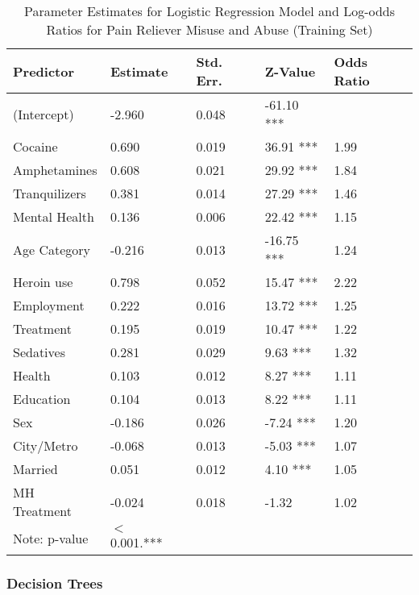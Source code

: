 \documentclass[sigconf]{acmart}
\begin{document}
\begin{table}
  \caption{Parameter Estimates for Logistic Regression Model and Log-odds 
  Ratios for Pain Reliever Misuse and Abuse (Training Set)}
  \label{tab:freq}
  \begin{tabular}{lllll}
    \toprule
    Predictor&  Estimate& Std. Err.& Z-Value & Odds Ratio \\    
    \midrule
    (Intercept)   & -2.960 &   0.048 & -61.10 *** &  \\
    Cocaine       & 0.690  &   0.019 &  36.91 *** & 1.99  \\
    Amphetamines  & 0.608  &   0.021 &  29.92 *** & 1.84  \\
    Tranquilizers & 0.381  &   0.014 &  27.29 *** & 1.46  \\
    Mental Health & 0.136  &   0.006 &  22.42 *** & 1.15  \\
    Age Category  & -0.216 &   0.013 & -16.75 *** & 1.24  \\
    Heroin use    & 0.798  &   0.052 &  15.47 *** & 2.22  \\  
    Employment    & 0.222  &   0.016 &  13.72 *** & 1.25  \\
    Treatment     & 0.195  &   0.019 &  10.47 *** & 1.22  \\
    Sedatives     & 0.281  &   0.029 &   9.63 *** & 1.32  \\   
    Health        & 0.103  &   0.012 &   8.27 *** & 1.11  \\
    Education     & 0.104  &   0.013 &   8.22 *** & 1.11  \\   
    Sex           & -0.186 &   0.026 &  -7.24 *** & 1.20  \\
    City/Metro    & -0.068 &   0.013 &  -5.03 *** & 1.07  \\
    Married       & 0.051  &   0.012 &   4.10 *** & 1.05  \\
    MH Treatment  & -0.024 &   0.018 &  -1.32     & 1.02  \\
    \bottomrule 
    Note: p-value& $<$ 0.001.***  &  &  &   
  \end{tabular}
\end{table}


\subsubsection{Decision Trees} 
\end{document}
